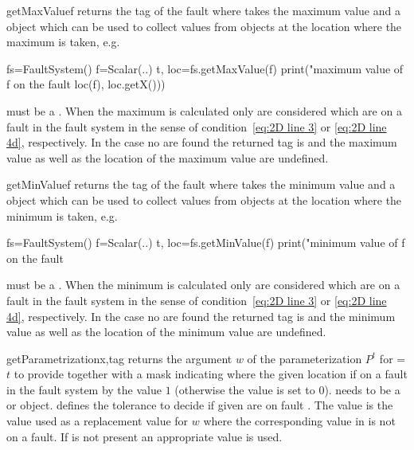 \begin{methoddesc}[FaultSystem]{getMaxValue}{f}
returns the tag of the fault where  takes the maximum value and a
 object which can be used to collect values from \Data objects
at the location where the maximum is taken, e.g.
\begin{python}
       fs=FaultSystem()
       f=Scalar(..)
       t, loc=fs.getMaxValue(f)
       print("maximum value of f on the fault %
             loc(f), loc.getX()))
\end{python}
 must be a \Scalar. When the maximum is calculated only
\DataSamplePoints are considered which are on a fault in the fault system in
the sense of condition~\ref{eq:2D line 3} or \ref{eq:2D line 4d}, respectively.
In the case no \DataSamplePoints are found the returned tag is  and
the maximum value as well as the location of the maximum value are undefined.
\end{methoddesc}

\begin{methoddesc}[FaultSystem]{getMinValue}{f}
returns the tag of the fault where  takes the minimum value and a
 object which can be used to collect values from \Data objects
at the location where the minimum is taken, e.g.
\begin{python}
  fs=FaultSystem()
  f=Scalar(..)
  t, loc=fs.getMinValue(f)
  print("minimum value of f on the fault %
\end{python}
 must be a \Scalar. When the minimum is calculated only
\DataSamplePoints are considered which are on a fault in the fault system in
the sense of condition~\ref{eq:2D line 3} or \ref{eq:2D line 4d}, respectively.
In the case no \DataSamplePoints are found the returned tag is  and
the minimum value as well as the location of the minimum value are undefined.
\end{methoddesc}

\begin{methoddesc}[FaultSystem]{getParametrization}{x,tag }
returns the argument $w$ of the parameterization $P^t$ for =$t$ to
provide  together with a mask indicating where the given location if on
a fault in the fault system by the value $1$ (otherwise the value is set to $0$).
 needs to be a \Vector or \numpyNDA object.
 defines the tolerance to decide if given \DataSamplePoints are on
fault . The value  is the value used as a replacement
value for $w$ where the corresponding value in  is not on a fault.
If  is not present an appropriate value is used.
\end{methoddesc}
 
